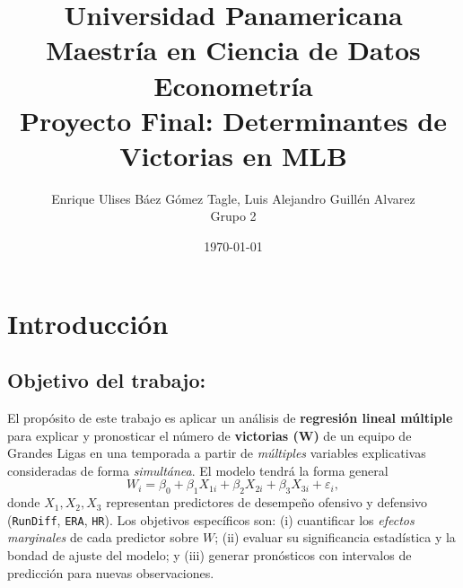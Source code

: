 \documentclass[man,floatsintext]{apa7}
\title{Universidad Panamericana\\ 
Maestría en Ciencia de Datos\\ 
Econometría\\ \vspace{0.5cm} 
Proyecto Final: Determinantes de Victorias en MLB
}
\author{Enrique Ulises Báez Gómez Tagle,
    Luis Alejandro Guillén Alvarez\\
    Grupo 2
}
\affiliation{Universidad Panamericana}
\date{\today}
\begin{document}
\maketitle

\tableofcontents

\newpage
\section{Introducción}
% 
\subsection{Objetivo del trabajo:}
El propósito de este trabajo es aplicar un análisis de \textbf{regresión lineal múltiple} para explicar y pronosticar el número de \textbf{victorias (W)} de un equipo de Grandes Ligas en una temporada a partir de \emph{múltiples} variables explicativas consideradas de forma \emph{simultánea}. El modelo tendrá la forma general
\[
W_i=\beta_0+\beta_1 X_{1i}+\beta_2 X_{2i}+\beta_3 X_{3i}+\varepsilon_i,
\]
donde $X_{1},X_{2},X_{3}$ representan predictores de desempeño ofensivo y defensivo (\texttt{RunDiff}, \texttt{ERA}, \texttt{HR}). Los objetivos específicos son: (i) cuantificar los \emph{efectos marginales} de cada predictor sobre $W$; (ii) evaluar su significancia estadística y la bondad de ajuste del modelo; y (iii) generar pronósticos con intervalos de predicción para nuevas observaciones.
%
%
\end{document}
